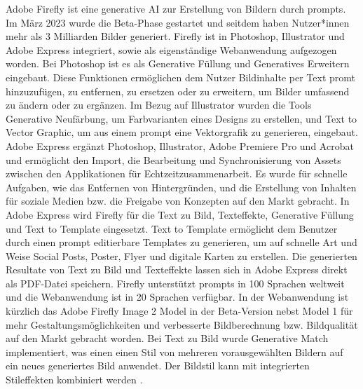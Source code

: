 Adobe Firefly ist eine generative AI zur Erstellung von Bildern durch prompts. Im März 2023 wurde die Beta-Phase gestartet und seitdem haben Nutzer*innen mehr als 3 Milliarden Bilder generiert. Firefly ist in Photoshop, Illustrator und Adobe Express integriert, sowie als eigenständige Webanwendung aufgezogen worden. Bei Photoshop ist es als Generative Füllung und Generatives Erweitern eingebaut. Diese Funktionen ermöglichen dem Nutzer Bildinhalte per Text promt hinzuzufügen, zu entfernen, zu ersetzen oder zu erweitern, um Bilder umfassend zu ändern oder zu ergänzen. Im Bezug auf Illustrator wurden die Tools Generative Neufärbung, um Farbvarianten eines Designs zu erstellen, und Text to Vector Graphic, um aus einem prompt eine Vektorgrafik zu generieren, eingebaut. Adobe Express ergänzt Photoshop, Illustrator, Adobe Premiere Pro und Acrobat und ermöglicht den Import, die Bearbeitung und Synchronisierung von Assets zwischen den Applikationen für Echtzeitzusammenarbeit. Es wurde für schnelle Aufgaben, wie das Entfernen von Hintergründen, und die Erstellung von Inhalten für soziale Medien bzw. die Freigabe von Konzepten auf den Markt gebracht. In Adobe Express wird Firefly für die Text zu Bild, Texteffekte, Generative Füllung und Text to Template eingesetzt. Text to Template ermöglicht dem Benutzer durch einen prompt editierbare Templates zu generieren, um auf schnelle Art und Weise Social Posts, Poster, Flyer und digitale Karten zu erstellen. Die generierten Resultate von Text zu Bild und Texteffekte lassen sich in Adobe Express direkt als PDF-Datei speichern. Firefly unterstützt prompts in 100 Sprachen weltweit und die Webanwendung ist in 20 Sprachen verfügbar. In der Webanwendung ist kürzlich das Adobe Firefly Image 2 Model in der Beta-Version nebst Model 1 für mehr Gestaltungsmöglichkeiten und verbesserte Bildberechnung bzw. Bildqualität auf den Markt gebracht worden. Bei Text zu Bild wurde Generative Match implementiert, was einen einen Stil von mehreren vorausgewählten Bildern auf ein neues generiertes Bild anwendet. Der Bildstil kann mit integrierten Stileffekten kombiniert werden \cite{adobe-firefly}.      











